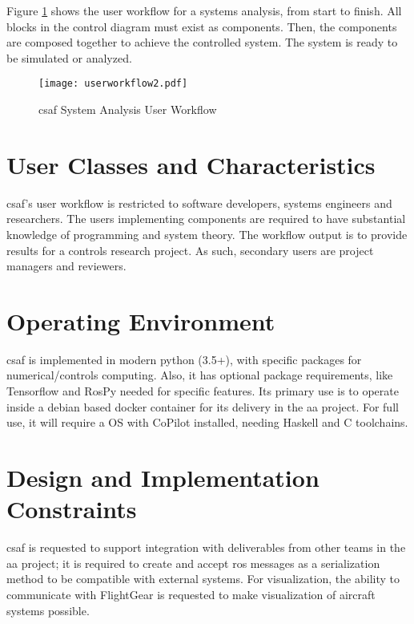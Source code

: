 Figure \ref{fig:uworkflow} shows the user workflow for a systems analysis, from start to finish. All blocks in the control diagram must exist as components. Then, the components are composed together to achieve the controlled system. The system is ready to be simulated or analyzed.

\begin{figure}
\centering
\texttt{[image: userworkflow2.pdf]}
\caption{ \acrshort{csaf} System Analysis User Workflow }
\label{fig:uworkflow}
\end{figure}

\section{User Classes and Characteristics}

\acrshort{csaf}'s user workflow is restricted to software developers, systems engineers and researchers. The users implementing components are required to have substantial knowledge of programming and system theory. The workflow output is to provide results for a controls research project. As such, secondary users are project managers and reviewers. 


\section{Operating Environment}

\acrshort{csaf} is implemented in modern python (3.5+), with specific packages for numerical/controls computing. Also, it has optional package requirements, like Tensorflow and RosPy needed for specific features. Its primary use is to operate inside a debian based docker container for its delivery in the \acrlong{aa} project. For full use, it will require a OS with CoPilot installed, needing Haskell and C toolchains.  

\section{Design and Implementation Constraints}

\acrshort{csaf} is requested to support integration with deliverables from other teams in the \acrshort{aa} project; it is required to create and accept \acrshort{ros} messages as a serialization method to be compatible with external systems. For visualization, the ability to communicate with FlightGear is requested to make visualization of aircraft systems possible. \\


